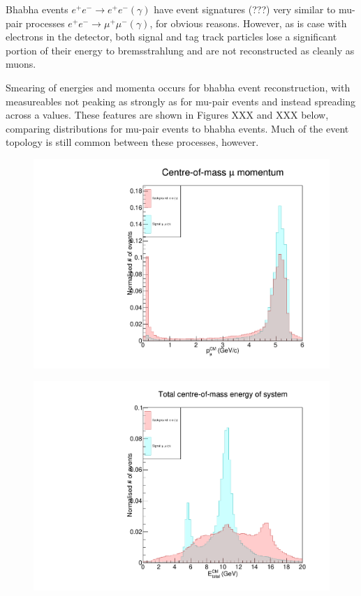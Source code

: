 \documentclass[12pt]{thesis}  %
\begin{document}
Bhabha events $e^+ e^- \to e^+ e^- (\gamma)$ have event signatures (???) very similar to mu-pair processes $e^+ e^- \to \mu^+ \mu^- (\gamma)$, for obvious reasons. However, as is case with electrons in the detector, both signal and tag track particles lose a significant portion of their energy to bremsstrahlung and are not reconstructed as cleanly as muons. 

Smearing of energies and momenta occurs for bhabha event reconstruction, with measureables not peaking as strongly as for mu-pair events and instead spreading across a values. These features are shown in Figures XXX and XXX below, comparing distributions for mu-pair events to bhabha events. Much of the event topology is still common between these processes, however.

\begin{figure}[h]
\centering
\begin{minipage}{.5\textwidth}
  \centering
  \includegraphics[width=\linewidth]{images/bhabha-mupair-muCM_P.pdf}
  \label{fig:test1}
\end{minipage}%
\begin{minipage}{.5\textwidth}
  \centering
  \includegraphics[width=\linewidth]{images/bhabha-mupair-totalCM_E.pdf}
  \label{fig:test2}
\end{minipage}
\end{figure}
\end{document}
